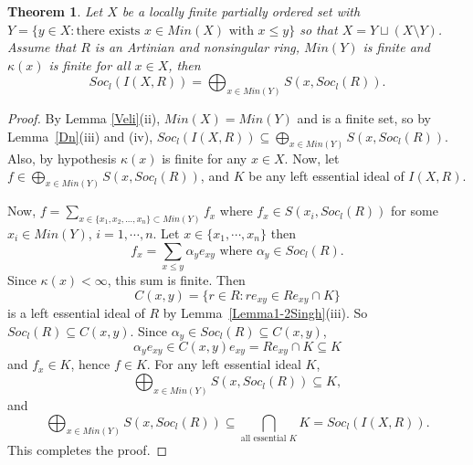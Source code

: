 \documentclass[12pt]{article}
\newtheorem{theorem}{Theorem}[subsection]
\begin{document}


\begin{theorem} \label{Main} 
	Let $X$ be a locally finite partially ordered set with $Y=\{y\in X: \text {there exists }  x\in Min(X) \text{ with }  x\leq y \}$  so that $X=Y\sqcup (X\setminus Y)$. Assume that $R$ is an Artinian and nonsingular ring, $Min(Y)$ is finite and $\kappa (x)$ is finite 
	for all $x\in X$, then \textbf{\ 
		\begin{equation*}
		Soc_{l}({I(X,R)})=\bigoplus_{x\in Min(Y)}S(x,Soc_{l}(R)).
		\end{equation*}
	}	
\end{theorem}	
\begin{proof}
By Lemma \ref{Veli}(ii), $Min(X)=Min(Y)$ and is a finite set, so by Lemma~\ref{Dn}(iii) and (iv), $Soc_{l}({I(X,R)}) \subseteq \bigoplus_{x\in Min(Y)}S(x,Soc_{l}(R))$. Also, by hypothesis $\kappa(x)$ is finite for any $x\in X$. Now, let $f\in \bigoplus_{x \in Min(Y)} S(x,Soc_l(R))$, and $K$ be any left essential ideal of $I(X,R)$. %

Now, $\displaystyle f=\sum_{x \in  \{x_1,x_2, ..., x_n \} \subset Min(Y)}f_{x}$ where $f_{x}\in S(x_{i},Soc_{l}(R))$ for
some $x_{i}\in Min(Y)$, $i=1,\cdots ,n$. Let $x\in \{x_{1},\cdots,x_{n}\} $ then 
\begin{equation*}
f_{x}=\sum_{x\leq y} \alpha_{y}e_{xy}\text{ where }%
\alpha_{y}\in Soc_{l}(R).
\end{equation*}%
Since $\kappa(x)< \infty$, this sum is finite. Then 
\begin{equation*}
C(x,y)=\{r\in R: re_{xy}\in Re_{xy}\cap K \} 
\end{equation*} is a left essential ideal of $R$ by Lemma~\ref{Lemma1-2Singh}(iii). So $ Soc_{l}(R)\subseteq C(x,y)$. 
Since $\alpha_{y}\in Soc_{l}(R)\subseteq C(x,y)$, 
\begin{equation*}
\alpha_{y}e_{xy}\in C(x,y)e_{xy}=Re_{xy}\cap K\subseteq K
\end{equation*}
and $f_{x}\in K$, hence $f\in K$. For any left essential ideal $K$, 
\begin{equation*}
\bigoplus_{x \in Min(Y)} S(x,Soc_l(R))\subseteq  K, 
\end{equation*}
and
\begin{equation*}
 \bigoplus_{x \in Min(Y)} S(x,Soc_l(R))\subseteq \bigcap_{ \mbox{all essential } K} K = Soc_l({I(X,R)}).  
\end{equation*}
This completes the proof. 
\end{proof}
\end{document}
